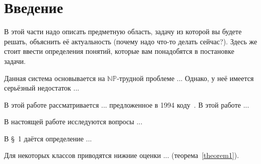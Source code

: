 \section*{Введение} 

В этой части надо описать предметную область, задачу из которой вы будете решать, объяснить её актуальность (почему надо что-то делать сейчас?).
Здесь же стоит ввести определения понятий, которые вам понадобятся в постановке задачи.

Данная система основывается на $\mathbf{\mathbb {NP}}$-трудной проблеме ... Однако, у неё имеется серьёзный недостаток ...

В этой работе рассматривается ...  предложенное в 1994 коду~\cite{Ivanov}. В этой работе ...

В настоящей работе исследуются вопросы ...

В \S~1 даётся определение ...


Для некоторых классов приводятся нижние оценки ... (теорема~\ref{theorem1}).